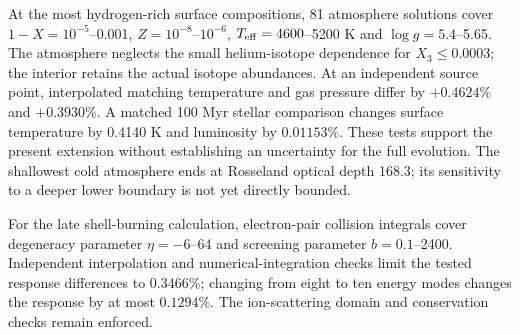 \documentclass[11pt,letterpaper]{article}
\begin{document}
At the most hydrogen-rich surface compositions, 81 atmosphere solutions
cover $1-X=10^{-5}$--0.001, $Z=10^{-8}$--$10^{-6}$,
$T_{\rm eff}=4600$--5200 K and $\log g=5.4$--5.65.
The atmosphere neglects the small helium-isotope dependence for
$X_3\leq0.0003$; the interior retains the actual isotope abundances.
At an independent source point, interpolated matching temperature and
gas pressure differ by $+0.4624\%$ and $+0.3930\%$.
A matched 100 Myr stellar comparison changes surface temperature by
0.4140 K and luminosity by $0.01153\%$. These tests support the present
extension without establishing an uncertainty for the full evolution.
The shallowest cold atmosphere ends at Rosseland optical depth 168.3;
its sensitivity to a deeper lower boundary is not yet directly bounded.

For the late shell-burning calculation, electron-pair collision integrals
cover degeneracy parameter $\eta=-6$--64 and screening parameter
$b=0.1$--2400. Independent interpolation and numerical-integration checks
limit the tested response differences to $0.3466\%$; changing from eight
to ten energy modes changes the response by at most $0.1294\%$.
The ion-scattering domain and conservation checks remain enforced.
\end{document}
